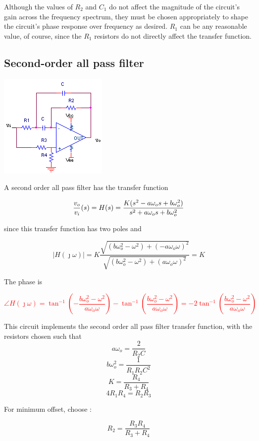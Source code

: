 Although the values of $R_2$ and $C_1$ do not affect the magnitude of the circuit's gain across the frequency spectrum, they must be chosen appropriately to shape the circuit's phase response over frequency as desired.
$R_1$ can be any reasonable value, of course, since the $R_1$ resistors do not directly affect the transfer function.

\subsection{Second-order all pass filter}
\begin{center}
	\includegraphics{schematics/2ndorder_allpass.PNG}
\end{center}
A second order all pass filter has the transfer function

\textcolor{red}{
\begin{equation}
\frac{\vout}{\vin}(s) = H(s) = \frac{K(s^2 - a\omega_{o}s + b\omega_{o}^2)}{s^2 + a\omega_{o}s + b\omega_{o}^2}
\label{eq:2ndorder_allpass}
\end{equation}
}

since this transfer function has two poles and

\begin{equation}
|H(\jmath\omega)| = K\frac{\sqrt{(b\omega_{o}^2-\omega^2) + (-a\omega_{o}\omega)^2}}{\sqrt{(b\omega_{o}^2-\omega^2) + (a\omega_{o}\omega)^2}} = K
\end{equation}

The phase is

\textcolor{red}{
\begin{equation}
\angle H(\jmath\omega) = \tan^{-1}\left(-\frac{b\omega_{o}^2-\omega^2}{a\omega_{o}\omega}\right) - \tan^{-1}\left(\frac{b\omega_{o}^2-\omega^2}{a\omega_{o}\omega}\right) = -2\tan^{-1}\left(\frac{b\omega_{o}^2-\omega^2}{a\omega_{o}\omega}\right)
\label{eq:2ndorder_allpass_angle}
\end{equation}
}

This circuit implements the second order all pass filter transfer function, with the resistors chosen such that
\begin{equation}
a\omega_{o} = \frac{2}{R_2 C}
\end{equation}
\begin{equation}
b\omega_{o}^2 = \frac{1}{R_1 R_2 C^2}
\end{equation}
\begin{equation}
K = \frac{R_4}{R_3 + R_4}
\end{equation}
\begin{equation}
4R_1 R_4 = R_2 R_3
\end{equation}

For minimum \DC offset, choose \autocite[151-153]{op-amp-circuits-johnson}:

\begin{equation}
R_2 = \frac{R_3 R_4}{R_3 + R_4}
\end{equation}